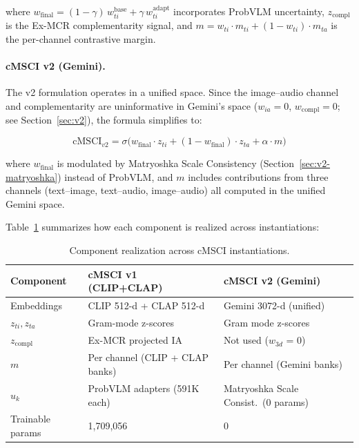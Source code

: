 \documentclass[a4paper,fleqn]{cas-sc}
\begin{document}
\begin{itemize}
where $w_{\mathrm{final}} = (1-\gamma)\,w_{ti}^{\mathrm{base}} + \gamma\,w_{ti}^{\mathrm{adapt}}$ incorporates ProbVLM uncertainty, $z_{\mathrm{compl}}$ is the Ex-MCR complementarity signal, and $m = w_{ti} \cdot m_{ti} + (1-w_{ti}) \cdot m_{ta}$ is the per-channel contrastive margin.

\paragraph{cMSCI v2 (Gemini).} The v2 formulation operates in a unified space. Since the image--audio channel and complementarity are uninformative in Gemini's space ($w_{ia} = 0$, $w_{\mathrm{compl}} = 0$; see Section~\ref{sec:v2}), the formula simplifies to:

\begin{equation}\label{eq:cmsci-v2}
\mathrm{cMSCI}_{v2} = \sigma\!\Big(w_{\mathrm{final}} \cdot z_{ti} + (1 - w_{\mathrm{final}}) \cdot z_{ta} + \alpha \cdot m\Big)
\end{equation}

where $w_{\mathrm{final}}$ is modulated by Matryoshka Scale Consistency (Section~\ref{sec:v2-matryoshka}) instead of ProbVLM, and $m$ includes contributions from three channels (text--image, text--audio, image--audio) all computed in the unified Gemini space.

Table~\ref{tab:component-comparison} summarizes how each component is realized across instantiations:

\begin{table}[t]
\caption{Component realization across cMSCI instantiations.}\label{tab:component-comparison}
\centering
\small
\begin{tabular}{lll}
\toprule
Component & cMSCI v1 (CLIP+CLAP) & cMSCI v2 (Gemini) \\
\midrule
Embeddings & CLIP 512-d + CLAP 512-d & Gemini 3072-d (unified) \\
$z_{ti}, z_{ta}$ & Gram-mode z-scores & Gram mode z-scores \\
$z_{\mathrm{compl}}$ & Ex-MCR projected IA & Not used ($w_{3d}$ = 0) \\
$m$ & Per channel (CLIP + CLAP banks) & Per channel (Gemini banks) \\
$u_k$ & ProbVLM adapters (591K each) & Matryoshka Scale Consist.\ (0 params) \\
Trainable params & 1,709,056 & 0 \\
\bottomrule
\end{tabular}
\end{table}


\end{itemize}
\end{document}
